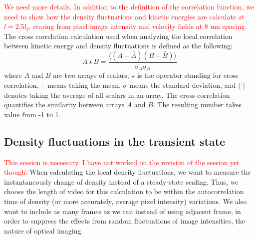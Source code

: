\documentclass[twocolumn,aps,prx,amsmath,amssymb,longbibliography]{revtex4-2}
\begin{document}
\textcolor{red}{We need more details. In addition to the definition of the correlation function, we need to show how the density fluctuations and kinetic energies are calculate at $l = 2.5l_b$, staring from pixel image intensity and velocity fields at 8 um spacing.}
The cross correlation calculation used when analyzing the local correlation between kinetic energy and density fluctuations is defined as the following:
\begin{equation}
\label{eq:cross-correlation}
A\star B = \frac{\langle(A-\bar A)(B-\bar B)\rangle}{\sigma_A\sigma_B}
\end{equation}
where $A$ and $B$ are two arrays of scalars, $\star$ is the operator standing for cross correlation, $\bar\cdot$ means taking the mean, $\sigma$ means the standard deviation, and $\langle\cdot\rangle$ denotes taking the average of all scalars in an array. The cross correlation quantifies the similarity between arrays $A$ and $B$. The resulting number takes value from -1 to 1.





\subsection{Density fluctuations in the transient state}

\textcolor{red}{This session is necessary. I have not worked on the revision of the session yet though.}
When calculating the local density fluctuations, we want to measure the instantaneously change of density instead of a steady-state scaling. Thus, we choose the length of video for this calculation to be within the autocorrelation time of density (or more accurately, average pixel intensity) variations. We also want to include as many frames as we can instead of using adjacent frame, in order to suppress the effects from random fluctuations of image intensities, the nature of optical imaging.

\end{document}
